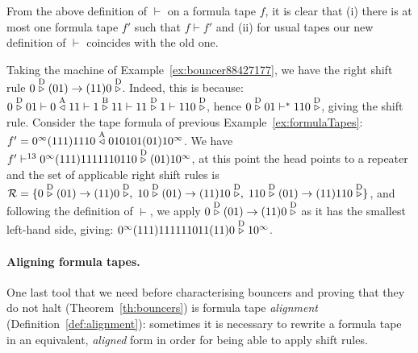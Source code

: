 From the above definition of $\vdash$ on a formula tape $f$, it is clear that (i) there is at most one formula tape $f'$ such that $f \vdash f'$ and (ii) for usual tapes our new definition of $\vdash$ coincides with the old one.


\begin{example}\label{ex:shiftRules}
    Taking the machine of Example~\ref{ex:bouncer88427177}, we have the right shift rule $0 \stackrel{\text{D}}\triangleright(01) \to (11)0\stackrel{\text{D}}\triangleright$. Indeed, this is because: $0 \stackrel{\text{D}}\triangleright01 \vdash 0\stackrel{\text{A}}\triangleleft11 \vdash 1\stackrel{\text{B}}\triangleright11 \vdash 11\stackrel{\text{D}}\triangleright1 \vdash 110\stackrel{\text{D}}\triangleright$, hence $0 \stackrel{\text{D}}\triangleright01 \vdash^* 110\stackrel{\text{D}}\triangleright$, giving the shift rule. Consider the tape formula of previous Example~\ref{ex:formulaTapes}: $f' = 0^\infty(111)1110 \stackrel{\text{A}}\triangleleft 010101(01)10^\infty$. We have $f' \vdash^{13} 0^\infty (111)1111110110 \stackrel{\text{D}}\triangleright (01) 10^\infty$, at this point the head points to a repeater and the set of applicable right shift rules is $\mathcal{R} = \{ 0 \stackrel{\text{D}}\triangleright(01) \to (11)0\stackrel{\text{D}}\triangleright,\; 10 \stackrel{\text{D}}\triangleright(01) \to (11)10\stackrel{\text{D}}\triangleright,\; 110 \stackrel{\text{D}}\triangleright(01) \to (11)110\stackrel{\text{D}}\triangleright\}$, and following the definition of $\vdash$, we apply $0 \stackrel{\text{D}}\triangleright(01) \to (11)0\stackrel{\text{D}}\triangleright$ as it has the smallest left-hand side, giving: $0^\infty (111)111111011(11)0 \stackrel{\text{D}}\triangleright 10^\infty$.

\end{example}

\paragraph*{Aligning formula tapes.} One last tool that we need before characterising bouncers and proving that they do not halt (Theorem~\ref{th:bouncers}) is formula tape \textit{alignment} (Definition~\ref{def:alignment}): sometimes it is necessary to rewrite a formula tape in an equivalent, \textit{aligned} form in order for being able to apply shift rules.

